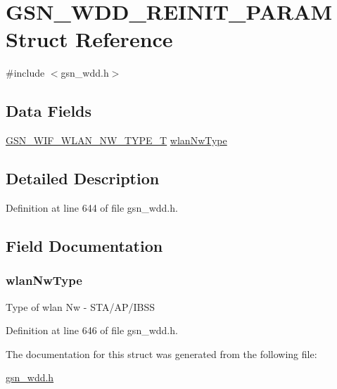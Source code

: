 \hypertarget{a00284}{
\section{GSN\_\-WDD\_\-REINIT\_\-PARAM Struct Reference}
\label{a00284}
}


{\ttfamily \#include $<$gsn\_\-wdd.h$>$}

\subsection*{Data Fields}
\begin{DoxyCompactItemize}
\item 
\hyperlink{a00677_gabc852e0cb262314c5f307a3e9802921e}{GSN\_\-WIF\_\-WLAN\_\-NW\_\-TYPE\_\-T} \hyperlink{a00284_a611759f3eaa5817846fb74212f7aaea5}{wlanNwType}
\end{DoxyCompactItemize}


\subsection{Detailed Description}


Definition at line 644 of file gsn\_\-wdd.h.



\subsection{Field Documentation}
\hypertarget{a00284_a611759f3eaa5817846fb74212f7aaea5}{
\subsubsection[{wlanNwType}]{ {\bf wlanNwType}}}
\label{a00284_a611759f3eaa5817846fb74212f7aaea5}
Type of wlan Nw -\/ STA/AP/IBSS 

Definition at line 646 of file gsn\_\-wdd.h.



The documentation for this struct was generated from the following file:\begin{DoxyCompactItemize}
\item 
\hyperlink{a00603}{gsn\_\-wdd.h}\end{DoxyCompactItemize}
